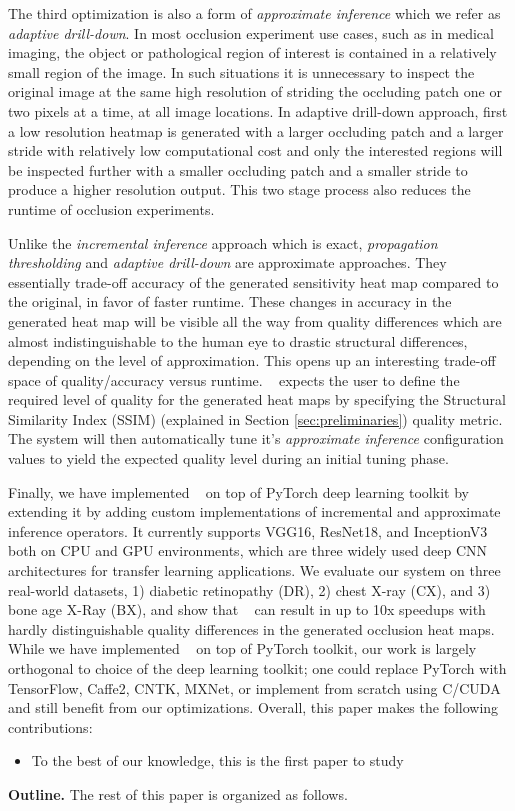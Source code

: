 The third optimization is also a form of \textit{approximate inference} which we refer as \textit{adaptive drill-down}.
In most occlusion experiment use cases, such as in medical imaging, the object or pathological region of interest is contained in a relatively small region of the image.
In such situations it is unnecessary to inspect the original image at the same high resolution of striding the occluding patch one or two pixels at a time, at all image locations.
In adaptive drill-down approach, first a low resolution heatmap is generated with a larger occluding patch and a larger stride with relatively low computational cost and only the interested regions will be inspected further with a smaller occluding patch and a smaller stride to produce a higher resolution output.
This two stage process also reduces the runtime of occlusion experiments.

Unlike the \textit{incremental inference} approach which is exact, \textit{propagation thresholding} and \textit{adaptive drill-down} are approximate approaches. They essentially trade-off accuracy of the generated sensitivity heat map compared to the original, in favor of faster runtime.
These changes in accuracy in the generated heat map will be visible all the way from quality differences which are almost indistinguishable to the human eye to drastic structural differences, depending on the level of approximation.
This opens up an interesting trade-off space of quality/accuracy versus runtime. \system~ expects the user to define the required level of quality for the generated heat maps by specifying the Structural Similarity Index (SSIM) (explained in Section \ref{sec:preliminaries}) quality metric.
The system will then automatically tune it's \textit{approximate inference} configuration values to yield the expected quality level during an initial tuning phase.

Finally, we have implemented \system~ on top of PyTorch deep learning toolkit by extending it by adding custom implementations of incremental and approximate inference operators.
It currently supports VGG16, ResNet18, and InceptionV3 both on CPU and GPU environments, which are three widely used deep CNN architectures for transfer learning applications.
We evaluate our system on three real-world datasets, 1) diabetic retinopathy (DR), 2) chest X-ray (CX), and 3) bone age X-Ray (BX), and show that \system~ can result in up to 10x speedups with hardly distinguishable quality differences in the generated occlusion heat maps. While we have implemented \system~ on top of PyTorch toolkit, our work is largely orthogonal to choice of the deep learning toolkit; one could replace PyTorch with TensorFlow, Caffe2, CNTK, MXNet, or implement from scratch using C/CUDA and still benefit from our optimizations.
Overall, this paper makes the following contributions:

\begin{itemize}
	\item To the best of our knowledge, this is the first paper to study
\end{itemize}

\vspace{2mm}
\noindent \textbf{Outline.} The rest of this paper is organized as follows.
